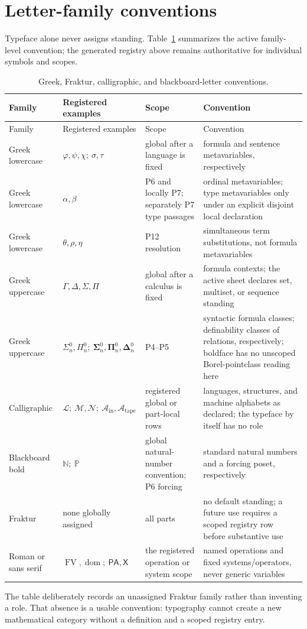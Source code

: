 \section{Letter-family conventions}
\label{sec:p01-letter-conventions}

Typeface alone never assigns standing.  Table~\ref{tab:p01-letter-families}
summarizes the active family-level convention; the generated registry above
remains authoritative for individual symbols and scopes.

\begingroup\small
\begin{longtable}{@{}p{}p{}p{}p{}@{}}
\caption{Greek, Fraktur, calligraphic, and blackboard-letter conventions.}
\label{tab:p01-letter-families}\\
\toprule
Family & Registered examples & Scope & Convention \\
\midrule
\endfirsthead
\toprule
Family & Registered examples & Scope & Convention \\
\midrule
\endhead
Greek lowercase & \(\varphi,\psi,\chi;\ \sigma,\tau\) & global after a language is fixed & formula and sentence metavariables, respectively \\
Greek lowercase & \(\alpha,\beta\) & P6 and locally P7; separately P7 type passages & ordinal metavariables; type metavariables only under an explicit disjoint local declaration \\
Greek lowercase & \(\theta,\rho,\eta\) & P12 resolution & simultaneous term substitutions, not formula metavariables \\
Greek uppercase & \(\Gamma,\Delta,\Sigma,\Pi\) & global after a calculus is fixed & formula contexts; the active sheet declares set, multiset, or sequence standing \\
Greek uppercase & \(\Sigma^0_n,\Pi^0_n;\ \boldsymbol\Sigma^0_n,
\boldsymbol\Pi^0_n,\boldsymbol\Delta^0_n\) & P4--P5 & syntactic
formula classes; definability classes of relations, respectively; boldface
has no unscoped Borel-pointclass reading here \\
Calligraphic & \(\mathcal L;\ \mathcal M,\mathcal N;\ \mathcal A_{\mathrm{in}},\mathcal A_{\mathrm{tape}}\) & registered global or part-local rows & languages, structures, and machine alphabets as declared; the typeface by itself has no role \\
Blackboard bold & \(\mathbb N;\ \mathbb P\) & global natural-number convention; P6 forcing & standard natural numbers and a forcing poset, respectively \\
Fraktur & none globally assigned & all parts & no default standing; a future use requires a scoped registry row before substantive use \\
Roman or sans serif & \(\operatorname{FV},\operatorname{dom};\ \mathsf{PA},\mathsf X\) & the registered operation or system scope & named operations and fixed systems/operators, never generic variables \\
\bottomrule
\end{longtable}
\endgroup

The table deliberately records an unassigned Fraktur family rather than
inventing a role.  That absence is a usable convention: typography cannot
create a new mathematical category without a definition and a scoped
registry entry.

